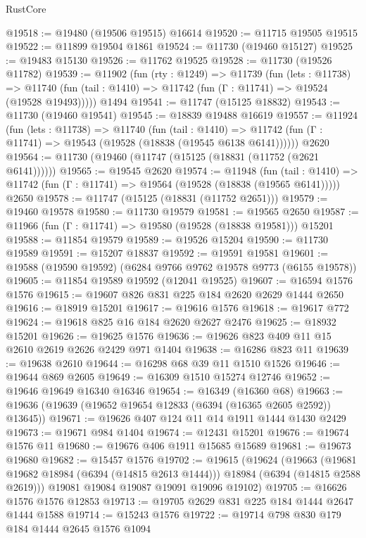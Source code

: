 \begin{lexlean}{RustCore}
\begin{coremodule}
@19518 := @19480 (@19506 @19515) @16614
@19520 := @11715 @19505 @19515
@19522 := @11899 @19504 @1861
@19524 := @11730 (@19460 @15127)
@19525 := @19483 @15130
@19526 := @11762 @19525
@19528 := @11730 (@19526 @11782)
@19539 := @11902
    (fun (rty : @1249) =>
    @11739
      (fun (lets : @11738) =>
      @11740 (fun (tail : @1410) => @11742 (fun (Γ : @11741) => @19524 (@19528 @19493)))))
    @1494
@19541 := @11747 (@15125 @18832)
@19543 := @11730 (@19460 @19541)
@19545 := @18839 @19488 @16619
@19557 := @11924
    (fun (lets : @11738) =>
    @11740
      (fun (tail : @1410) =>
      @11742 (fun (Γ : @11741) => @19543 (@19528 (@18838 (@19545 @6138 @6141))))))
    @2620
@19564 := @11730 (@19460 (@11747 (@15125 (@18831 (@11752 (@2621 @6141))))))
@19565 := @19545 @2620
@19574 := @11948
    (fun (tail : @1410) => @11742 (fun (Γ : @11741) => @19564 (@19528 (@18838 (@19565 @6141)))))
    @2650
@19578 := @11747 (@15125 (@18831 (@11752 @2651)))
@19579 := @19460 @19578
@19580 := @11730 @19579
@19581 := @19565 @2650
@19587 := @11966 (fun (Γ : @11741) => @19580 (@19528 (@18838 @19581))) @15201
@19588 := @11854 @19579
@19589 := @19526 @15204
@19590 := @11730 @19589
@19591 := @15207 @18837
@19592 := @19591 @19581
@19601 := @19588 (@19590 @19592) (@6284 @9766 @9762 @19578 @9773 (@6155 @19578))
@19605 := @11854 @19589 @19592 (@12041 @19525)
@19607 := @16594 @1576 @1576
@19615 := @19607 @826 @831 @225 @184 @2620 @2629 @1444 @2650
@19616 := @18919 @15201
@19617 := @19616 @1576
@19618 := @19617 @772
@19624 := @19618 @825 @16 @184 @2620 @2627 @2476
@19625 := @18932 @15201
@19626 := @19625 @1576
@19636 := @19626 @823 @409 @11 @15 @2610 @2619 @2626 @2429 @971 @1404
@19638 := @16286 @823 @11
@19639 := @19638 @2610
@19644 := @16298 @68 @39 @11 @1510 @1526
@19646 := @19644 @869 @2605
@19649 := @16309 @1510 @15274 @12746
@19652 := @19646 @19649 @16340 @16346
@19654 := @16349 (@16360 @68)
@19663 := @19636 (@19639 (@19652 @19654 @12833 (@6394 (@16365 @2605 @2592)) @13645))
@19671 := @19626 @407 @124 @11 @14 @1911 @1444 @1430 @2429
@19673 := @19671 @984 @1404
@19674 := @12431 @15201
@19676 := @19674 @1576 @11
@19680 := @19676 @406 @1911 @15685 @15689
@19681 := @19673 @19680
@19682 := @15457 @1576
@19702 := @19615
    (@19624
      (@19663
        (@19681 @19682 @18984 (@6394 (@14815 @2613 @1444)))
        @18984
        (@6394 (@14815 @2588 @2619)))
      @19081
      @19084
      @19087
      @19091
      @19096
      @19102)
@19705 := @16626 @1576 @1576 @12853
@19713 := @19705 @2629 @831 @225 @184 @1444 @2647 @1444 @1588
@19714 := @15243 @1576
@19722 := @19714 @798 @830 @179 @184 @1444 @2645 @1576 @1094

\end{coremodule}
\end{lexlean}
